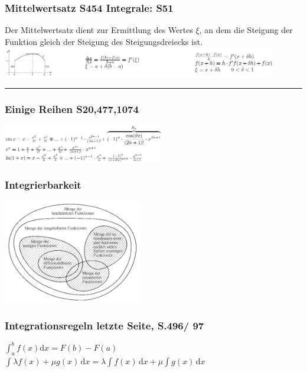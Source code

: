 \subsubsection{Mittelwertsatz \color{red}S454 Integrale: S51}
Der Mittelwertsatz dient zur Ermittlung des Wertes $\xi$, an dem die Steigung der Funktion gleich der Steigung des Steigungsdreiecks ist.
\includegraphics[width=12cm]{images/MWSd.PNG}\\
\hrule
\begin{multicols}{2}
\subsubsection{Einige Reihen \color{red}S20,477,1074}
\includegraphics[width=7cm]{images/Reihen.PNG}\\
\subsubsection{Integrierbarkeit}
\includegraphics[width=6cm]{images/Integral.PNG}\\


\subsubsection{Integrationsregeln \color{red} letzte Seite, S.496/ 97}
$\int_a^b f(x) \mathrm dx = F(b) - F(a)$\\
$\int\lambda f(x)+\mu g(x) \, \mathrm dx=\lambda\int f(x) \, \mathrm dx + \mu\int g(x) \, \mathrm dx$


\end{multicols}
